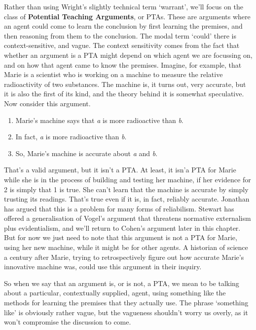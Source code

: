 Rather than using Wright's slightly technical term `warrant', we'll focus on the class of \textbf{Potential Teaching Arguments}, or PTAs. These are arguments where an agent could come to learn the conclusion by first learning the premises, and then reasoning from them to the conclusion. The modal term `could' there is context-sensitive, and vague. The context sensitivity comes from the fact that whether an argument is a PTA might depend on which agent we are focussing on, and on how that agent came to know the premises. Imagine, for example, that \gls{Marie} is a scientist who is working on a machine to measure the relative radioactivity of two substances. The machine is, it turns out, very accurate, but it is also the first of its kind, and the theory behind it is somewhat speculative. Now consider this argument.

\begin{enumerate}
\item{} \gls{Marie}'s machine says that \emph{a} is more radioactive than \emph{b}.

\item{} In fact, \emph{a} is more radioactive than \emph{b}.

\item{} So, \gls{Marie}'s machine is accurate about \emph{a} and \emph{b}.

\end{enumerate}
That's a valid argument, but it isn't a PTA. At least, it isn'a PTA for \gls{Marie} while she is in the process of building and testing her machine, if her evidence for 2 is simply that 1 is true. She can't learn that the machine is accurate by simply trusting its readings. That's true even if it is, in fact, reliably accurate. Jonathan \citet{Vogel2000} has argued that this is a problem for many forms of reliabilism. Stewart \citet{Cohen2002, Cohen2005} has offered a generalisation of Vogel's argument that threatens normative externalism plus evidentialism, and we'll return to Cohen's argument later in this chapter. But for now we just need to note that this argument is not a PTA for \gls{Marie}, using her new machine, while it might be for other agents. A historian of science a century after \gls{Marie}, trying to retrospectively figure out how accurate \gls{Marie}'s innovative machine was, could use this argument in their inquiry.

So when we say that an argument is, or is not, a PTA, we mean to be talking about a particular, contextually supplied, agent, using something like the methods for learning the premises that they actually use. The phrase `something like' is obviously rather vague, but the vagueness shouldn't worry us overly, as it won't compromise the discussion to come.


